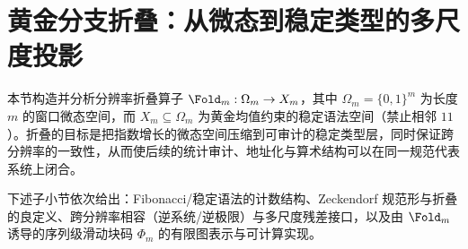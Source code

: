 \section{黄金分支折叠：从微态到稳定类型的多尺度投影}\label{sec:folding}

本节构造并分析分辨率折叠算子 \(\Fold_m:\Omega_m\to X_m\)，其中 \(\Omega_m=\{0,1\}^m\) 为长度 \(m\) 的窗口微态空间，而 \(X_m\subseteq\Omega_m\) 为黄金均值约束的稳定语法空间（禁止相邻 \(11\)）。折叠的目标是把指数增长的微态空间压缩到可审计的稳定类型层，同时保证跨分辨率的一致性，从而使后续的统计审计、地址化与算术结构可以在同一规范代表系统上闭合。\par
下述子小节依次给出：Fibonacci/稳定语法的计数结构、Zeckendorf 规范形与折叠的良定义、跨分辨率相容（逆系统/逆极限）与多尺度残差接口，以及由 \(\Fold_m\) 诱导的序列级滑动块码 \(\Phi_m\) 的有限图表示与可计算实现。


















